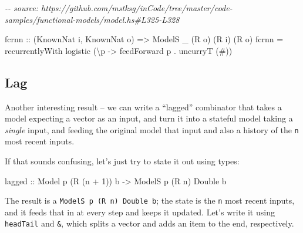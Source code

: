 \documentclass[]{article}
\newenvironment{Shaded}{}{}
\newcommand{\CommentTok}[1]{\textcolor[rgb]{0.38,0.63,0.69}{\textit{#1}}}
\newcommand{\DataTypeTok}[1]{\textcolor[rgb]{0.56,0.13,0.00}{#1}}
\newcommand{\DecValTok}[1]{\textcolor[rgb]{0.25,0.63,0.44}{#1}}
\newcommand{\NormalTok}[1]{#1}
\newcommand{\OperatorTok}[1]{\textcolor[rgb]{0.40,0.40,0.40}{#1}}
\newcommand{\OtherTok}[1]{\textcolor[rgb]{0.00,0.44,0.13}{#1}}
\begin{document}
\begin{Shaded}
\begin{Highlighting}[]
\CommentTok{{-}{-} source: https://github.com/mstksg/inCode/tree/master/code{-}samples/functional{-}models/model.hs\#L325{-}L328}

\NormalTok{fcrnn\textquotesingle{}}
\OtherTok{    ::}\NormalTok{ (}\DataTypeTok{KnownNat}\NormalTok{ i, }\DataTypeTok{KnownNat}\NormalTok{ o)}
    \OtherTok{=\textgreater{}} \DataTypeTok{ModelS}\NormalTok{ \_ (}\DataTypeTok{R}\NormalTok{ o) (}\DataTypeTok{R}\NormalTok{ i) (}\DataTypeTok{R}\NormalTok{ o)}
\NormalTok{fcrnn\textquotesingle{} }\OtherTok{=}\NormalTok{ recurrentlyWith logistic (\textbackslash{}p }\OtherTok{{-}\textgreater{}}\NormalTok{ feedForward p }\OperatorTok{.}\NormalTok{ uncurryT (}\OperatorTok{\#}\NormalTok{))}
\end{Highlighting}
\end{Shaded}

\subsection{Lag}\label{lag}

Another interesting result -- we can write a ``lagged'' combinator that takes a
model expecting a vector as an input, and turn it into a stateful model taking a
\emph{single} input, and feeding the original model that input and also a
history of the \texttt{n} most recent inputs.

If that sounds confusing, let's just try to state it out using types:

\begin{Shaded}
\begin{Highlighting}[]
\OtherTok{lagged ::} \DataTypeTok{Model}\NormalTok{  p       (}\DataTypeTok{R}\NormalTok{ (n }\OperatorTok{+} \DecValTok{1}\NormalTok{)) b}
       \OtherTok{{-}\textgreater{}} \DataTypeTok{ModelS}\NormalTok{ p (}\DataTypeTok{R}\NormalTok{ n) }\DataTypeTok{Double}\NormalTok{      b}
\end{Highlighting}
\end{Shaded}

The result is a \texttt{ModelS\ p\ (R\ n)\ Double\ b}; the state is the
\texttt{n} most recent inputs, and it feeds that in at every step and keeps it
updated. Let's write it using \texttt{headTail} and \texttt{\&}, which splits a
vector and adds an item to the end, respectively.
\end{document}
